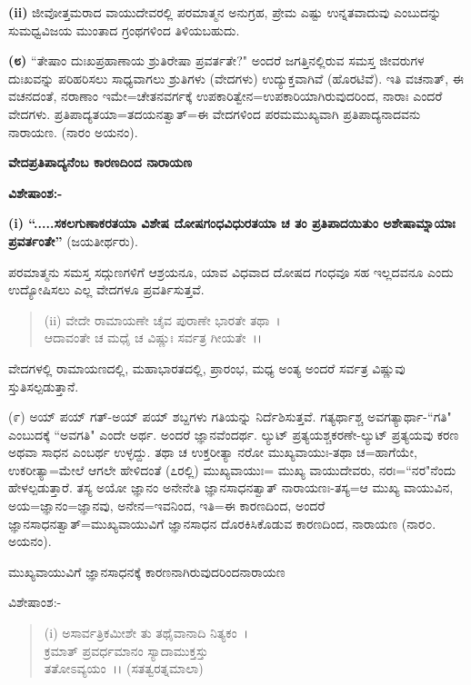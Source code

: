 \textbf{(ii)} ಜೀವೋತ್ತಮರಾದ ವಾಯುದೇವರಲ್ಲಿ ಪರಮಾತ್ಮನ ಅನುಗ್ರಹ, ಪ್ರೇಮ ಎಷ್ಟು ಉನ್ನತವಾದುವು ಎಂಬುದನ್ನು ಸುಮಧ್ವವಿಜಯ ಮುಂತಾದ ಗ್ರಂಥಗಳಿಂದ ತಿಳಿಯಬಹುದು.

\textbf{(೮)} ``ತೇಷಾಂ ದುಃಖಪ್ರಹಾಣಾಯ ಶ್ರುತಿರೇಷಾ ಪ್ರವರ್ತತೇ?" ಅಂದರೆ ಜಗತ್ತಿನಲ್ಲಿರುವ ಸಮಸ್ತ ಜೀವರುಗಳ ದುಃಖವನ್ನು ಪರಿಹರಿಸಲು ಸಾಧ್ಯವಾಗಲು ಶ್ರುತಿಗಳು (ವೇದಗಳು) ಉದ್ಯುಕ್ತವಾಗಿವೆ (ಹೊರಟಿವೆ). ಇತಿ ವಚನಾತ್, ಈ ವಚನದಂತೆ, ನರಾಣಾಂ ಇಮೇ=ಚೇತನವರ್ಗಕ್ಕೆ ಉಪಕಾರಿತ್ವೇನ=ಉಪಕಾರಿಯಾಗಿರುವುದರಿಂದ, ನಾರಾಃ ಎಂದರೆ ವೇದಗಳು. ಪ್ರತಿಪಾದ್ಯತಯಾ=ತದಯನತ್ವಾತ್=ಈ ವೇದಗಳಿಂದ ಪರಮಮುಖ್ಯವಾಗಿ ಪ್ರತಿಪಾದ್ಯನಾದವನು ನಾರಾಯಣ. (ನಾರಂ ಅಯನಂ).

\begin{center}
\textbf{ವೇದಪ್ರತಿಪಾದ್ಯನೆಂಬ ಕಾರಣದಿಂದ ನಾರಾಯಣ}
\end{center}

\noindent
\textbf{ವಿಶೇಷಾಂಶ:-}

\textbf{(i) ``.....ಸಕಲಗುಣಾಕರತಯಾ ವಿಶೇಷ ದೋಷಗಂಧವಿಧುರತಯಾ ಚ ತಂ ಪ್ರತಿಪಾದಯಿತುಂ ಅಶೇಷಾಮ್ನಾಯಾಃ ಪ್ರವರ್ತಂತೇ”} (ಜಯತೀರ್ಥರು).

ಪರಮಾತ್ಮನು ಸಮಸ್ತ ಸದ್ಗುಣಗಳಿಗೆ ಆಶ್ರಯನೂ, ಯಾವ ವಿಧವಾದ ದೋಷದ ಗಂಧವೂ ಸಹ ಇಲ್ಲದವನೂ ಎಂದು ಉದ್ಯೋಷಿಸಲು ಎಲ್ಲ ವೇದಗಳೂ ಪ್ರವರ್ತಿಸುತ್ತವೆ.

\begin{verse}
(ii) ವೇದೇ ರಾಮಾಯಣೇ ಚೈವ ಪುರಾಣೇ ಭಾರತೇ ತಥಾ~।\\ ಆದಾವಂತೇ ಚ ಮಧೈ ಚ ವಿಷ್ಣುಃ ಸರ್ವತ್ರ ಗೀಯತೇ~।।
\end{verse}


ವೇದಗಳಲ್ಲಿ ರಾಮಾಯಣದಲ್ಲಿ, ಮಹಾಭಾರತದಲ್ಲಿ, ಪ್ರಾರಂಭ, ಮಧ್ಯ ಅಂತ್ಯ ಅಂದರೆ ಸರ್ವತ್ರ ವಿಷ್ಣುವು ಸ್ತುತಿಸಲ್ಪಡುತ್ತಾನೆ.

(೯) ಅಯ್ ಪಯ್ ಗತ್‌-ಅಯ್ ಪಯ್ ಶಬ್ದಗಳು ಗತಿಯನ್ನು ನಿರ್ದೆಶಿಸುತ್ತವೆ. ಗತ್ಯರ್ಥಾಶ್ಚ ಅವಗತ್ಯಾರ್ಥಾ-``ಗತಿ" ಎಂಬುದಕ್ಕೆ ``ಅವಗತಿ" ಎಂದೇ ಅರ್ಥ. ಅಂದರೆ ಜ್ಞಾನವೆಂದರ್ಥ. ಲ್ಯುಟ್ ಪ್ರತ್ಯಯಶ್ಚಕರಣೇ-ಲ್ಯುಟ್ ಪ್ರತ್ಯಯವು ಕರಣ ಅಥವಾ ಸಾಧನ ಎಂಬರ್ಥ ಉಳ್ಳದ್ದು. ತಥಾ ಚ ಉಕ್ತರೀತ್ಯಾ ನರೋ ಮುಖ್ಯವಾಯುಃ-ತಥಾ ಚ=ಹಾಗೆಯೇ, ಉಕರೀತ್ಯಾ=ಮೇಲೆ ಆಗಲೇ ಹೇಳಿದಂತೆ (೭ರಲ್ಲಿ) ಮುಖ್ಯವಾಯುಃ= ಮುಖ್ಯ ವಾಯುದೇವರು, ನರಃ=``ನರ"ನೆಂದು ಹೇಳಲ್ಪಡುತ್ತಾರೆ. ತಸ್ಯ ಅಯೋ ಜ್ಞಾನಂ ಅನೇನೇತಿ ಜ್ಞಾನಸಾಧನತ್ವಾತ್ ನಾರಾಯಣಃ-ತಸ್ಯ=ಆ ಮುಖ್ಯ ವಾಯುವಿನ, ಅಯ=ಜ್ಞಾನಂ=ಜ್ಞಾನವು, ಅನೇನ=ಇವನಿಂದ, ಇತಿ=ಈ ಕಾರಣದಿಂದ, ಅಂದರೆ ಜ್ಞಾನಸಾಧನತ್ವಾತ್=ಮುಖ್ಯವಾಯುವಿಗೆ ಜ್ಞಾನಸಾಧನ ದೊರಕಿಸಿಕೊಡುವ ಕಾರಣದಿಂದ, ನಾರಾಯಣ (ನಾರ೦. ಅಯನಂ).

\begin{center}
ಮುಖ್ಯವಾಯುವಿಗೆ ಜ್ಞಾನಸಾಧನಕ್ಕೆ ಕಾರಣನಾಗಿರುವುದರಿಂದನಾರಾಯಣ
\end{center}

\noindent
ವಿಶೇಷಾಂಶ:-

\begin{verse}
(i) ಅಸಾರ್ವತ್ರಿಕಮೀಶೇ ತು ತಥೈವಾನಾದಿ ನಿತ್ಯಕಂ~।\\ ಕ್ರಮಾತ್ ಪ್ರವರ್ಧಮಾನಂ ಸ್ಯಾದಾಮುಕ್ತಸ್ತು\\ ತತೋಽವ್ಯಯಂ~।। (ಸತತ್ವರತ್ನಮಾಲಾ)
\end{verse}

